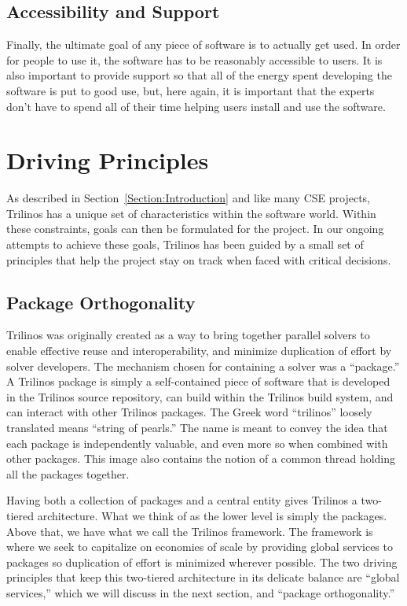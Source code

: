 \documentclass{doublecol}
\begin{document}
\subsection{Accessibility and Support}
Finally, the ultimate goal of any piece of software is to actually
get used. In order for people to use it, the software has to be
reasonably accessible to users.  It is also important to provide
support so that all of the energy spent developing the software is
put to good use, but, here again, it is important that the experts
don't have to spend all of their time helping users install and use
the software.


\section{Driving Principles}
\label{Section:Driving Principles}

As described in Section~\ref{Section:Introduction} and like many CSE
projects, Trilinos has a unique set of characteristics within the
software world. Within these constraints, goals can then be
formulated for the project.  In our ongoing attempts to achieve
these goals, Trilinos has been guided by a small set of principles
that help the project stay on track when faced with critical
decisions.

\subsection{Package Orthogonality}

Trilinos was originally created as a way to bring together parallel
solvers to enable effective reuse and interoperability, and minimize
duplication of effort by solver developers.  The mechanism chosen
for containing a solver was a ``package.''  A Trilinos package is
simply a self-contained piece of software that is developed in the
Trilinos source repository, can build within the Trilinos build
system, and can interact with other Trilinos packages. The Greek
word ``trilinos'' loosely translated means ``string of pearls.'' The
name is meant to convey the idea that each package is independently
valuable, and even more so when combined with other packages. This
image also contains the notion of a common thread holding all the
packages together.

Having both a collection of packages and a central entity gives
Trilinos a two-tiered architecture.  What we think of as the lower
level is simply the packages.  Above that, we have what we call the
Trilinos framework.  The framework is where we seek to capitalize on
economies of scale by providing global services to packages so
duplication of effort is minimized wherever possible. The two
driving principles that keep this two-tiered architecture in its
delicate balance are ``global services,'' which we will discuss in
the next section, and ``package orthogonality.''
\end{document}
